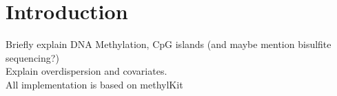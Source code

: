 \section{Introduction}

Briefly explain DNA Methylation, CpG islands (and maybe mention bisulfite sequencing?)\\
Explain overdispersion and covariates.\\
All implementation is based on methylKit \cite{23034086}
  
